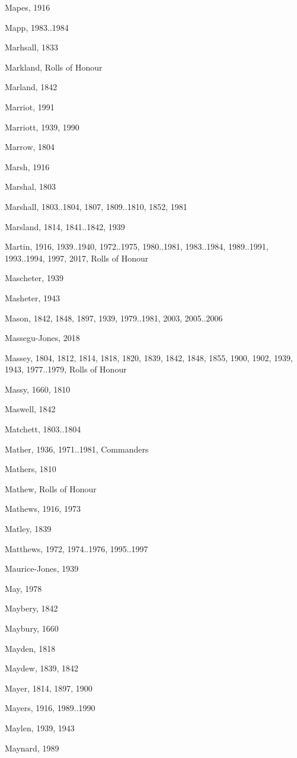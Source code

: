 {\begin{theindex}
\item Mapes, 1916
\item Mapp, 1983..1984
\item Marhsall, 1833
\item Markland, Rolls of Honour
\item Marland, 1842
\item Marriot, 1991
\item Marriott, 1939, 1990
\item Marrow, 1804
\item Marsh, 1916
\item Marshal, 1803
\item Marshall, 1803..1804, 1807, 1809..1810, 1852, 1981
\item Marsland, 1814, 1841..1842, 1939
\item Martin, 1916, 1939..1940, 1972..1975, 1980..1981, 1983..1984, 1989..1991, 1993..1994, 1997, 2017, Rolls of Honour
\item Mascheter, 1939
\item Masheter, 1943
\item Mason, 1842, 1848, 1897, 1939, 1979..1981, 2003, 2005..2006
\item Massegu-Jones, 2018
\item Massey, 1804, 1812, 1814, 1818, 1820, 1839, 1842, 1848, 1855, 1900, 1902, 1939, 1943, 1977..1979, Rolls of Honour
\item Massy, 1660, 1810
\item Maswell, 1842
\item Matchett, 1803..1804
\item Mather, 1936, 1971..1981, Commanders
\item Mathers, 1810
\item Mathew, Rolls of Honour
\item Mathews, 1916, 1973
\item Matley, 1839
\item Matthews, 1972, 1974..1976, 1995..1997
\item Maurice-Jones, 1939
\item May, 1978
\item Maybery, 1842
\item Maybury, 1660
\item Mayden, 1818
\item Maydew, 1839, 1842
\item Mayer, 1814, 1897, 1900
\item Mayers, 1916, 1989..1990
\item Maylen, 1939, 1943
\item Maynard, 1989

\end{theindex}}
